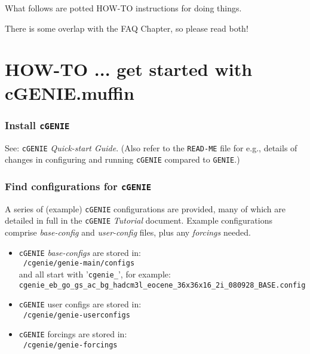 \documentclass[11pt,fleqn]{book} %
\begin{document}
\hfill \break
\vspace{24mm}

\Large
What follows are potted HOW-TO instructions for doing things.
\vspace{2mm}

There is some overlap with the FAQ Chapter, so please read both!
\normalsize


\newpage


\section{HOW-TO ... get started with cGENIE.muffin}\label{how-to-0}
\vspace{2mm}

%
\subsubsection{Install \texttt{cGENIE}}\label{Install cGENIE}

\vspace{1mm}
See: \texttt{cGENIE} \textit{Quick-start Guide}. (Also refer to the \texttt{READ-ME} file for e.g., details of changes in configuring and running \texttt{cGENIE} compared to \texttt{GENIE}.)

%
\subsubsection{Find configurations for \texttt{cGENIE}}\label{Find configurations for cGENIE}

\vspace{1mm}
A series of (example) \texttt{cGENIE} configurations are provided, many of which are detailed in full in the \texttt{cGENIE} \textit{Tutorial} document.
Example configurations comprise \textit{base-config} and \textit{user-config} files, plus any \textit{forcings} needed.
\begin{itemize}[noitemsep]
\item\texttt{cGENIE} \textit{base-configs} are stored in:
\\ \texttt{~/cgenie/genie-main/configs}
\\and all start with '\texttt{cgenie\_}', for example: \\ \texttt{cgenie\_eb\_go\_gs\_ac\_bg\_hadcm3l\_eocene\_36x36x16\_2i\_080928\_BASE.config}
\item \texttt{cGENIE} user configs are stored in:
\\ \texttt{~/cgenie/genie-userconfigs}
\item \texttt{cGENIE} forcings are stored in:
\\ \texttt{~/cgenie/genie-forcings}
\end{itemize}
\end{document}
